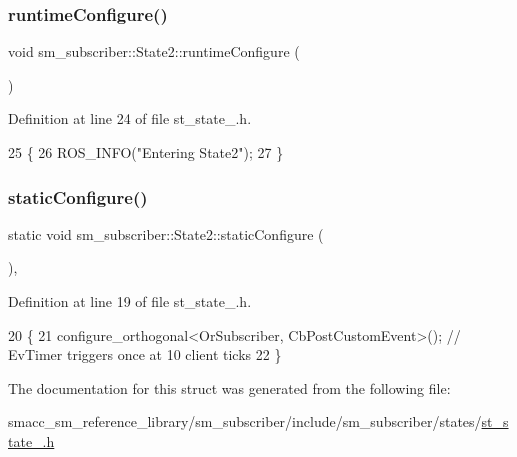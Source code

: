 \subsubsection{\texorpdfstring{runtime\+Configure()}{runtimeConfigure()}}
{\footnotesize\ttfamily void sm\+\_\+subscriber\+::\+State2\+::runtime\+Configure (\begin{DoxyParamCaption}{ }\end{DoxyParamCaption})\hspace{0.3cm}{\ttfamily [inline]}}



Definition at line 24 of file st\+\_\+state\+\_.\+h.


\begin{DoxyCode}
25   \{
26     ROS\_INFO(\textcolor{stringliteral}{"Entering State2"});
27   \}
\end{DoxyCode}
\mbox{\label{structsm__subscriber_1_1State2_a4d2b2f5f8b2953a208ef2dda3e0eb666}} 
\subsubsection{\texorpdfstring{static\+Configure()}{staticConfigure()}}
{\footnotesize\ttfamily static void sm\+\_\+subscriber\+::\+State2\+::static\+Configure (\begin{DoxyParamCaption}{ }\end{DoxyParamCaption})\hspace{0.3cm}{\ttfamily [inline]}, {\ttfamily [static]}}



Definition at line 19 of file st\+\_\+state\+\_.\+h.


\begin{DoxyCode}
20   \{
21     configure\_orthogonal<OrSubscriber, CbPostCustomEvent>();  \textcolor{comment}{// EvTimer triggers once at 10 client ticks}
22   \}
\end{DoxyCode}


The documentation for this struct was generated from the following file\+:\begin{DoxyCompactItemize}
\item 
smacc\+\_\+sm\+\_\+reference\+\_\+library/sm\+\_\+subscriber/include/sm\+\_\+subscriber/states/\hyperlink{sm__subscriber_2include_2sm__subscriber_2states_2st__state__2_8h}{st\+\_\+state\+\_.\+h}\end{DoxyCompactItemize}
